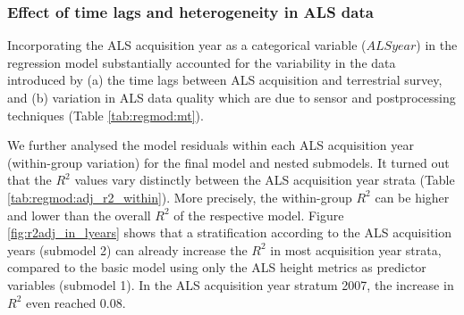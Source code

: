 \subsubsection*{Effect of time lags and heterogeneity in ALS data}

Incorporating the ALS acquisition year as a categorical variable ($ALSyear$) in the regression model substantially accounted for the variability in the data introduced by (a) the time lags between ALS acquisition and terrestrial survey, and (b) variation in ALS data quality which are due to sensor and postprocessing techniques (Table \ref{tab:regmod:mt}). \par

We further analysed the model residuals within each ALS acquisition year (within-group variation) for the final model and nested submodels. It turned out that the $R^2$ values vary distinctly between the ALS acquisition year strata (Table \ref{tab:regmod:adj_r2_within}). More precisely, the within-group $R^2$ can be higher and lower than the overall $R^2$ of the respective model. Figure \ref{fig:r2adj_in_lyears} shows that a stratification according to the ALS acquisition years (submodel 2) can already increase the $R^2$ in most acquisition year strata, compared to the basic model using only the ALS height metrics as predictor variables (submodel 1). In the ALS acquisition year stratum 2007, the increase in $R^2$ even reached 0.08.



